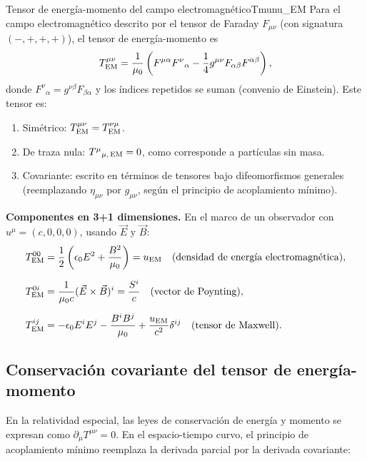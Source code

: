 \begin{proposicion}{Tensor de energía-momento del campo electromagnético}{Tmunu_EM}
Para el campo electromagnético descrito por el tensor de Faraday $F_{\mu\nu}$ (con signatura $(-,+,+,+)$), el tensor de energía-momento es
\begin{equation}
  T^{\mu\nu}_{\rm EM} = \frac{1}{\mu_0}\left(F^{\mu\alpha}F^\nu{}_\alpha - \frac{1}{4}g^{\mu\nu}F_{\alpha\beta}F^{\alpha\beta}\right),
  \label{eq:Tmunu_EM}
\end{equation}
donde $F^\nu{}_\alpha = g^{\nu\beta}F_{\beta\alpha}$ y los índices repetidos se suman (convenio de Einstein). Este tensor es:
\begin{enumerate}[leftmargin=2em]
  \item Simétrico: $T^{\mu\nu}_{\rm EM} = T^{\nu\mu}_{\rm EM}$.
  \item De traza nula: $T^\mu{}_{\mu,\,\rm EM} = 0$, como corresponde a partículas sin masa.
  \item Covariante: escrito en términos de tensores bajo difeomorfismos generales (reemplazando $\eta_{\mu\nu}$ por $g_{\mu\nu}$, según el principio de acoplamiento mínimo).
\end{enumerate}
\end{proposicion}

\textbf{Componentes en 3+1 dimensiones.} En el marco de un observador con $u^\mu = (c,0,0,0)$, usando $\vec{E}$ y $\vec{B}$:
\begin{align}
  T^{00}_{\rm EM} &= \frac{1}{2}\left(\epsilon_0 E^2 + \frac{B^2}{\mu_0}\right) = u_{\rm EM}
  \quad\text{(densidad de energía electromagnética)}, \nl
  T^{0i}_{\rm EM} &= \frac{1}{\mu_0 c}(\vec{E}\times\vec{B})^i = \frac{S^i}{c}
  \quad\text{(vector de Poynting)}, \nl
  T^{ij}_{\rm EM} &= -\epsilon_0 E^i E^j - \frac{B^i B^j}{\mu_0} + \frac{u_{\rm EM}}{c^2}\delta^{ij}
  \quad\text{(tensor de Maxwell)}.
\end{align}

\subsection{Conservación covariante del tensor de energía-momento}
\label{sec:conservacion_Tmunu}

En la relatividad especial, las leyes de conservación de energía y momento se expresan como $\partial_\mu T^{\mu\nu} = 0$. En el espacio-tiempo curvo, el principio de acoplamiento mínimo reemplaza la derivada parcial por la derivada covariante:


